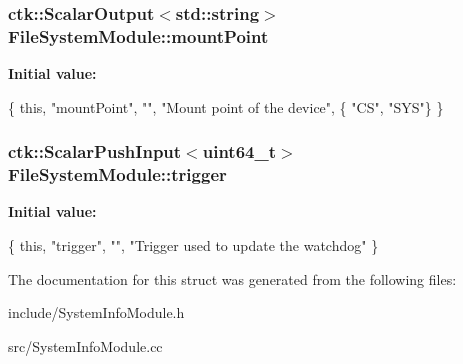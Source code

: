 \subsubsection[{\texorpdfstring{mount\+Point}{mountPoint}}]{\setlength{\rightskip}{0pt plus 5cm}ctk\+::\+Scalar\+Output$<$std\+::string$>$ File\+System\+Module\+::mount\+Point}\hypertarget{structFileSystemModule_a545e53dc460a9bc47d589769b76c452d}{}\label{structFileSystemModule_a545e53dc460a9bc47d589769b76c452d}
{\bfseries Initial value\+:}
\begin{DoxyCode}
\{ \textcolor{keyword}{this}, \textcolor{stringliteral}{"mountPoint"}, \textcolor{stringliteral}{""}, \textcolor{stringliteral}{"Mount point of the device"},
          \{ \textcolor{stringliteral}{"CS"}, \textcolor{stringliteral}{"SYS"}\} \}
\end{DoxyCode}
\subsubsection[{\texorpdfstring{trigger}{trigger}}]{\setlength{\rightskip}{0pt plus 5cm}ctk\+::\+Scalar\+Push\+Input$<$uint64\+\_\+t$>$ File\+System\+Module\+::trigger}\hypertarget{structFileSystemModule_a9aa6745dca44753b6b41bdacfbad39b6}{}\label{structFileSystemModule_a9aa6745dca44753b6b41bdacfbad39b6}
{\bfseries Initial value\+:}
\begin{DoxyCode}
\{ \textcolor{keyword}{this}, \textcolor{stringliteral}{"trigger"}, \textcolor{stringliteral}{""},
      \textcolor{stringliteral}{"Trigger used to update the watchdog"} \}
\end{DoxyCode}


The documentation for this struct was generated from the following files\+:\begin{DoxyCompactItemize}
\item 
include/System\+Info\+Module.\+h\item 
src/System\+Info\+Module.\+cc\end{DoxyCompactItemize}

